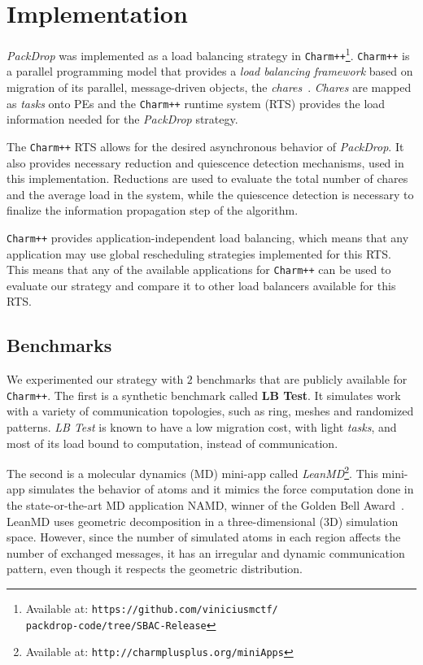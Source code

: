 \section{Implementation} \label{sec:impl}

\textit{PackDrop} was implemented as a load balancing strategy in \texttt{Charm++}\footnote{Available at: \texttt{https://github.com/viniciusmctf/\\packdrop-code/tree/SBAC-Release}}.
\texttt{Charm++} is a parallel programming model that provides a \textit{load balancing framework} based on migration of its parallel, message-driven objects, the \textit{chares}~\cite{CharmLOTR}.
\textit{Chares} are mapped as \textit{tasks} onto PEs and the \texttt{Charm++} runtime system (RTS) provides the load information needed for the \textit{PackDrop} strategy.

The \texttt{Charm++} RTS allows for the desired asynchronous behavior of \textit{PackDrop}.
It also provides necessary reduction and quiescence detection mechanisms, used in this implementation.
Reductions are used to evaluate the total number of chares and the average load in the system, while the quiescence detection is necessary to finalize the information propagation step of the algorithm.

\texttt{Charm++} provides application-independent load balancing, which means that any application %
may use global rescheduling strategies implemented for this RTS.
This means that any of the available applications for \texttt{Charm++} can be used to evaluate our strategy and compare it to other load balancers available for this RTS.


\subsection{Benchmarks} \label{sec:benchmarks}

We experimented our strategy with $2$ benchmarks that are publicly available for \texttt{Charm++}.
The first is a synthetic benchmark called \textbf{LB Test}. 
It simulates work with a variety of communication topologies, such as ring, meshes and randomized patterns.
\textit{LB Test} is known to have a low migration cost, with light \textit{tasks}, and most of its load bound to computation, instead of communication.

The second is a molecular dynamics (MD) mini-app called \textit{LeanMD}\footnote{Available at: \texttt{http://charmplusplus.org/miniApps}}.
This mini-app simulates the behavior of atoms and it mimics the force computation done in the state-or-the-art MD application NAMD, winner of the Golden Bell Award~\cite{grapevine}.
LeanMD uses geometric decomposition in a three-dimensional ($3$D) simulation space.
However, since the number of simulated atoms in each region affects the number of exchanged messages, it has an irregular and dynamic communication pattern, even though it respects the geometric distribution.

